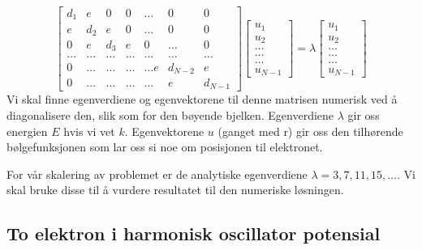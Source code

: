 \documentclass[reprint,english,notitlepage]{revtex4-1}
\begin{document}
	\begin{equation*}
	\begin{bmatrix}d_1 & e & 0   & 0    & \dots  &0     & 0 \\
	e & d_2 & e & 0    & \dots  &0     &0 \\
	0   & e & d_3 & e  &0       &\dots & 0\\
	\dots  & \dots & \dots & \dots  &\dots      &\dots & \dots\\
	0   & \dots & \dots & \dots  &\dots  e     &d_{N-2} & e\\
	0   & \dots & \dots & \dots  &\dots       &e & d_{N-1}
	\end{bmatrix}  \begin{bmatrix} u_{1} \\
	u_{2} \\
	\dots\\ \dots\\ \dots\\
	u_{N-1}
	\end{bmatrix}=\lambda \begin{bmatrix} u_{1} \\
	u_{2} \\
	\dots\\ \dots\\ \dots\\
	u_{N-1}
	\end{bmatrix}
	\end{equation*}
	Vi skal finne egenverdiene og egenvektorene til denne matrisen numerisk ved å diagonalisere den, slik som for den bøyende bjelken. Egenverdiene $\lambda$ gir oss energien $E$ hvis vi vet $k$. Egenvektorene $u$ (ganget med r) gir oss den tilhørende bølgefunksjonen som lar oss si noe om posisjonen til elektronet.
	
	For vår skalering av problemet er de analytiske egenverdiene $\lambda=3,7,11,15,\dots$. Vi skal bruke disse til å vurdere resultatet til den numeriske løsningen.
	
\subsection{To elektron i harmonisk oscillator potensial}
	
\end{document}
